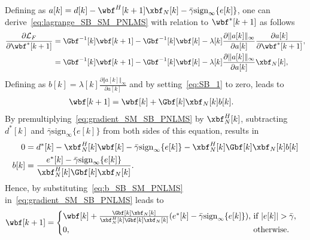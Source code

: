 Defining as $a[k] = d[k] - \wbf^H[k+1]\xbf_N[k] - \bar{\gamma}\mathrm{sign}_{\infty}\{e[k]\}$, one can derive~\eqref{eq:lagrange_SB_SM_PNLMS} with relation to $\wbf^*[k+1]$ as follows
\begin{align}\label{eq:SB_1}
	\frac{\partial \mathcal{L}_F}{\partial \wbf^*[k+1]} &= \Gbf^{-1}[k]\wbf[k+1] - \Gbf^{-1}[k]\wbf[k] - \lambda[k]\frac{\partial \Vert a[k]\Vert_\infty}{\partial a[k]}\frac{\partial a[k]}{\partial \wbf^*[k+1]},\nonumber\\
	 &= \Gbf^{-1}[k]\wbf[k+1] - \Gbf^{-1}[k]\wbf[k] - \lambda[k]\frac{\partial \Vert a[k]\Vert_\infty}{\partial a[k]}\xbf_N[k],
\end{align}
Defining as $b[k] = \lambda[k]\frac{\partial \Vert a[k]\Vert_\infty}{\partial a[k]}$ and by setting~\eqref{eq:SB_1} to zero, leads to 
\begin{align}\label{eq:gradient_SM_SB_PNLMS}
	\wbf[k+1] &= \wbf[k]+ \Gbf[k]\xbf_N[k]b[k].
\end{align}
By premultiplying~\eqref{eq:gradient_SM_SB_PNLMS} by $\xbf_N^H[k]$, subtracting $d^*[k]$ and $\bar{\gamma}\mathrm{sign}_{\infty}\{e[k]\}$ from both sides of this equation, results in
\begin{align}\label{eq:b_SB_SM_PNLMS}
	0 &= d^*[k] - \xbf_N^H[k]\wbf[k] - \bar{\gamma}\mathrm{sign}_{\infty}\{e[k]\} - \xbf_N^H[k]\Gbf[k]\xbf_N[k]b[k] \nonumber\\
	b[k] & = \frac{e^*[k] - \bar{\gamma}\mathrm{sign}_{\infty}\{e[k]\}}{\xbf_N^H[k]\Gbf[k]\xbf_N[k]}.
\end{align}
Hence, by substituting~\eqref{eq:b_SB_SM_PNLMS} in~\eqref{eq:gradient_SM_SB_PNLMS} leads to
\begin{align}\label{eq:finalSB_SM_PNLMS}
	\wbf[k+1] &= \begin{cases}
				\wbf[k]+ \frac{\Gbf[k]\xbf_N[k]}{\xbf_N^H[k]\Gbf[k]\xbf_N[k]}(e^*[k] - \bar{\gamma}\mathrm{sign}_{\infty}\{e[k]\}) , \!\!\!\!&\mathrm{if\;} \vert e[k]\vert > \bar{\gamma},\\
				0, & \mathrm{otherwise}.
	             \end{cases}
\end{align}


